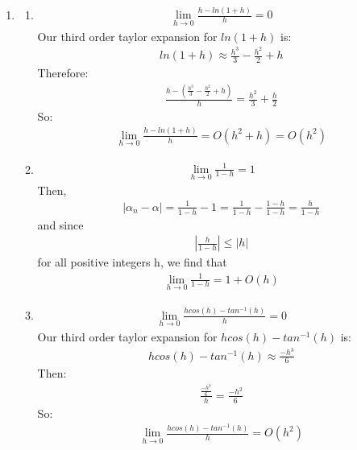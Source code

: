 \documentclass[12pt,letterpaper]{article}
\begin{document}
    \begin{enumerate}
        \item 
        \begin{enumerate}
            \item
                \begin{gather*}
                    \lim_{h \rightarrow 0} \frac{h-ln(1+h)}{h} = 0
                \end{gather*}
                Our third order taylor expansion for $ln(1+h)$ is: 
                \begin{gather*}
                    ln(1+h) \approx \frac{h^3}{3} -\frac{h^2}{2} + h
                \end{gather*}
                Therefore: 
                \begin{gather*}
                    \frac{h-(\frac{h^3}{3} -\frac{h^2}{2} + h)}{h} = \frac{h^2}{3} + \frac{h}{2}
                \end{gather*}
                So: 
                \begin{gather*}
                    \lim_{h \rightarrow 0} \frac{h-ln(1+h)}{h} = O(h^2 + h) = O(h^2)
                \end{gather*}
            \item 
                \begin{gather*}
                    \lim_{h \rightarrow 0} \frac{1}{1-h} = 1
                \end{gather*}
                Then,
                \begin{gather*}
                    |\alpha_{n} - \alpha| = \frac{1}{1-h} - 1 = \frac{1}{1-h} - \frac{1-h}{1-h} = \frac{h}{1-h}
                \end{gather*}
                and since 
                \begin{gather*}
                    |\frac{h}{1-h}| \leq |h|
                \end{gather*}
                for all positive integers h, we find that
                \begin{gather*}
                    \lim_{h \rightarrow 0} \frac{1}{1-h} = 1 + O(h)
                \end{gather*}
            \item 
            \begin{gather*}
                \lim_{h \rightarrow 0} \frac{hcos(h) - tan^{-1}(h)}{h} = 0
            \end{gather*}
            Our third order taylor expansion for $hcos(h) - tan^{-1}(h)$ is: 
            \begin{gather*}
                hcos(h) - tan^{-1}(h) \approx \frac{-h^3}{6}
            \end{gather*}
            Then: 
            \begin{gather*}
                \frac{\frac{-h^3}{6}}{h} = \frac{-h^2}{6}
            \end{gather*}
            So: 
            \begin{gather*}
                \lim_{h \rightarrow 0} \frac{hcos(h) - tan^{-1}(h)}{h} = O(h^2)
            \end{gather*}
        \end{enumerate}


\end{enumerate}
\end{document}

